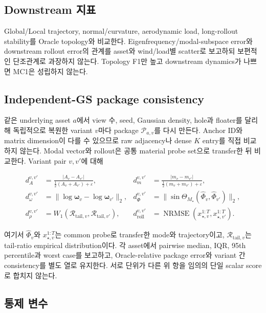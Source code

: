 \documentclass[11pt,a4paper]{article}
\newcommand{\eps}{\varepsilon}
\begin{document}
\subsection*{Downstream 지표}

Global/Local trajectory, normal/curvature, aerodynamic load,
long-rollout stability를 Oracle topology와 비교한다.
Eigenfrequency/modal-subspace error와 downstream rollout error의 관계를
asset와 wind/load별 scatter로 보고하되 보편적인 단조관계로 과장하지 않는다.
Topology F1만 높고 downstream dynamics가 나쁘면 MC1은 성립하지 않는다.

\subsection*{Independent-GS package consistency}

같은 underlying asset \(a\)에서 view 수, seed, Gaussian density, hole과 floater를 달리해
독립적으로 복원한 variant \(v\)마다 package \(\mathcal P_{a,v}\)를 다시 만든다.
Anchor ID와 matrix dimension이 다를 수 있으므로 raw adjacency나 dense \(K\) entry를 직접 비교하지 않는다.
Modal vector와 rollout은 공통 material probe set으로 transfer한 뒤 비교한다.
Variant pair \(v,v'\)에 대해

\begin{equation}
\begin{aligned}
  d_A^{v,v'}
  &=\frac{|A_v-A_{v'}|}{\tfrac12(A_v+A_{v'})+\eps},
  &d_m^{v,v'}
  &=\frac{|m_v-m_{v'}|}{\tfrac12(m_v+m_{v'})+\eps},\\
  d_\omega^{v,v'}
  &=\|\log\boldsymbol\omega_v-\log\boldsymbol\omega_{v'}\|_2,
  &d_\Phi^{v,v'}
  &=\|\sin\Theta_{M_\star}(\widehat\Phi_v,\widehat\Phi_{v'})\|_2,\\
  d_\rho^{v,v'}
  &=W_1(\mathcal R_{\mathrm{tail},v},\mathcal R_{\mathrm{tail},v'}),
  &d_{\mathrm{roll}}^{v,v'}
  &=\operatorname{NRMSE}(x_{\star,v}^{1:T},x_{\star,v'}^{1:T}).
  \label{eq:independent-gs-package-consistency}
\end{aligned}
\end{equation}

여기서 \(\widehat\Phi_v\)와 \(x_{\star,v}^{1:T}\)는 common probe로 transfer한 mode와 trajectory이고,
\(\mathcal R_{\mathrm{tail},v}\)는 tail-ratio empirical distribution이다.
각 asset에서 pairwise median, IQR, 95th percentile과 worst case를 보고하고,
Oracle-relative package error와 variant 간 consistency를 별도 열로 유지한다.
서로 단위가 다른 위 항을 임의의 단일 scalar score로 합치지 않는다.

\subsection*{통제 변수}
\end{document}
